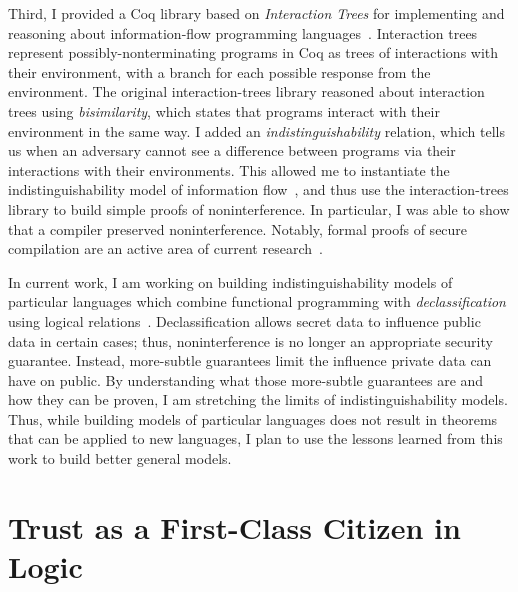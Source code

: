 \documentclass{article}
\theoremstyle{definition}
\begin{document}
Third, I provided a Coq library based on \emph{Interaction Trees} for implementing and reasoning about information-flow programming languages~\citep{SilverHHCZ22}.
Interaction trees represent possibly-nonterminating programs in Coq as trees of interactions with their environment, with a branch for each possible response from the environment.
The original interaction-trees library reasoned about interaction trees using \emph{bisimilarity}, which states that programs interact with their environment in the same way.
I added an \emph{indistinguishability} relation, which tells us when an adversary cannot see a difference between programs via their interactions with their environments.
This allowed me to instantiate the indistinguishability model of information flow~\citep{SabelfeldS99}, and thus use the interaction-trees library to build simple proofs of noninterference.
In particular, I was able to show that a compiler preserved noninterference.
Notably, formal proofs of secure compilation are an active area of current research~\citep{AbateBGHPT19}.

In current work, I am working on building indistinguishability models of particular languages which combine functional programming with \emph{declassification} using logical relations~\citep{MenzHLG22}.
Declassification allows secret data to influence public data in certain cases; thus, noninterference is no longer an appropriate security guarantee.
Instead, more-subtle guarantees limit the influence private data can have on public.
By understanding what those more-subtle guarantees are and how they can be proven, I am stretching the limits of indistinguishability models.
Thus, while building models of particular languages does not result in theorems that can be applied to new languages, I plan to use the lessons learned from this work to build better general models.

\section*{Trust as a First-Class Citizen in Logic}
\end{document}
